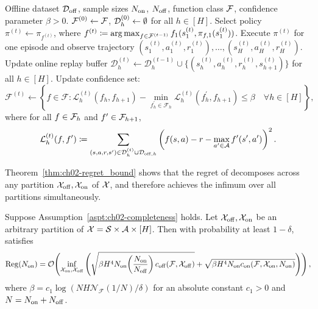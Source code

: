 \begin{algorithm}[htbp]
    \caption{Optimistic Hybrid RL with General Function Approximation}
    \label{alg:ch02-alg1}
    \begin{algorithmic}[1]
         Offline dataset ${\mathcal{D}}_{{\operatorname{off}}}$, sample sizes $N_{{\operatorname{on}}}$, $N_{{\operatorname{off}}}$, function class ${\mathcal{F}}$, confidence parameter $\beta > 0$.
         ${\mathcal{F}}^{(0)} \leftarrow {\mathcal{F}}$, ${\mathcal{D}}_h^{(0)}\leftarrow \emptyset$ for all $h \in [H]$.
            \State Select policy $\pi^{(t)} \leftarrow \pi_{f^{(t)}}$, where $f^{(t)} \coloneqq \operatorname*{arg\,max}_{f \in \mathcal{F}^{(t-1)}} f_1(s_1^{(t)}, \pi_{f, 1}(s_1^{(t)}))$.
            \State Execute $\pi^{(t)}$ for one episode and observe trajectory $(s_1^{(t)}, a_1^{(t)}, r_1^{(t)}), \dots, (s_H^{(t)}, a_H^{(t)}, r_H^{(t)})$.
            \State Update online replay buffer $\mathcal{D}_h^{(t)} \leftarrow \mathcal{D}_h^{(t-1)} \cup\{(s_h^{(t)}, a_h^{(t)}, r_h^{(t)}, s_{h+1}^{(t)})\}$ for all $h \in[H]$.
            \State Update confidence set:
            \begin{equation*}
                \mathcal{F}^{(t)} \leftarrow\left\{f \in \mathcal{F}: \mathcal{L}_h^{(t)}\!\left(f_h, f_{h+1}\right)-\min _{f_h^{\prime} \in \mathcal{F}_h} \mathcal{L}_h^{(t)}\!\left(f_h^{\prime}, f_{h+1}\right) \leq \beta \quad \forall h \in[H]\right\},
            \end{equation*}
            where for all $f \in {\mathcal{F}}_h$ and $f' \in {\mathcal{F}}_{h+1}$,
            \begin{equation*}
                \mathcal{L}_h^{(t)}\!\left(f, f^{\prime}\right) \coloneqq \sum_{\left(s, a, r, s^{\prime}\right) \in \mathcal{D}_h^{(t)} \cup \mathcal{D}_{{\operatorname{off}}, h}}\left(f(s, a)-r-\max _{a^{\prime} \in \mathcal{A}} f^{\prime}\!\left(s^{\prime}, a^{\prime}\right)\right)^2.
            \end{equation*}
        \EndFor
    \end{algorithmic}
\end{algorithm}

Theorem~\ref{thm:ch02-regret_bound} shows that the regret of  decomposes across any partition ${\mathcal{X}}_{{\operatorname{off}}}, {\mathcal{X}}_{{\operatorname{on}}}$ of ${\mathcal{X}}$, and therefore achieves the infimum over all partitions simultaneously.

\begin{thm}
\label{thm:ch02-regret_bound}
Suppose Assumption~\ref{aspt:ch02-completeness} holds. Let ${\mathcal{X}}_{{\operatorname{off}}}, {\mathcal{X}}_{{\operatorname{on}}}$ be an arbitrary partition of ${\mathcal{X}} = {\mathcal{S}} \times {\mathcal{A}} \times [H]$. Then with probability at least $1-\delta$,  satisfies
\begin{equation}
    \operatorname{Reg}(N_{{\operatorname{on}}})
    = {\mathcal{O}}\!\left(\inf_{{\mathcal{X}}_{{\operatorname{on}}}, {\mathcal{X}}_{{\operatorname{off}}}} \left(\sqrt{\beta H^4N_{{\operatorname{on}}}\!\left(\frac{N_{{\operatorname{on}}}}{N_{{\operatorname{off}}}}\right) c_{{\operatorname{off}}}({\mathcal{F}}, {\mathcal{X}}_{{\operatorname{off}}})}  + \sqrt{\beta H^4 N_{{\operatorname{on}}} c_{{\operatorname{on}}}({\mathcal{F}}, {\mathcal{X}}_{{\operatorname{on}}}, N_{{\operatorname{on}}})}\right)\right),
\end{equation}
where $\beta = c_1\log\!\left(N H \mathcal{N}_{\mathcal{F}}(1/N) / \delta\right)$ for an absolute constant $c_1 > 0$ and $N = N_{{\operatorname{on}}} + N_{{\operatorname{off}}}$.
\end{thm}

